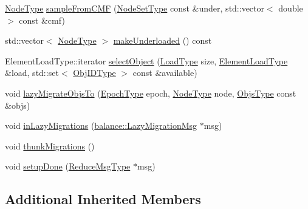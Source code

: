 \begin{DoxyCompactItemize}
\item 
\hyperlink{namespacevt_a866da9d0efc19c0a1ce79e9e492f47e2}{Node\+Type} \hyperlink{structvt_1_1vrt_1_1collection_1_1lb_1_1_gossip_l_b_a1a9e88510b1b61a181c9b4dcb3a8c153}{sample\+From\+C\+MF} (\hyperlink{structvt_1_1vrt_1_1collection_1_1lb_1_1_gossip_l_b_abb53f1d4bd3c37f3e68c3b5b0e1f1c86}{Node\+Set\+Type} const \&under, std\+::vector$<$ double $>$ const \&cmf)
\item 
std\+::vector$<$ \hyperlink{namespacevt_a866da9d0efc19c0a1ce79e9e492f47e2}{Node\+Type} $>$ \hyperlink{structvt_1_1vrt_1_1collection_1_1lb_1_1_gossip_l_b_a244326d030b7b9b82328d2ce617fef43}{make\+Underloaded} () const
\item 
Element\+Load\+Type\+::iterator \hyperlink{structvt_1_1vrt_1_1collection_1_1lb_1_1_gossip_l_b_adafa0d7c3295e095149f48c3027b3173}{select\+Object} (\hyperlink{structvt_1_1vrt_1_1collection_1_1lb_1_1_base_l_b_a215e22b9f12678303f49615ae3be05cc}{Load\+Type} size, \hyperlink{structvt_1_1vrt_1_1collection_1_1lb_1_1_base_l_b_aa286d31a0820a8fc9218ccb858368fca}{Element\+Load\+Type} \&load, std\+::set$<$ \hyperlink{structvt_1_1vrt_1_1collection_1_1lb_1_1_base_l_b_a15a2f756b59c8c2437985206b32aa403}{Obj\+I\+D\+Type} $>$ const \&available)
\item 
void \hyperlink{structvt_1_1vrt_1_1collection_1_1lb_1_1_gossip_l_b_a12cd87d3d0f4c186ffca1b554f5086dc}{lazy\+Migrate\+Objs\+To} (\hyperlink{namespacevt_a985a5adf291c34a3ca263b3378388236}{Epoch\+Type} epoch, \hyperlink{namespacevt_a866da9d0efc19c0a1ce79e9e492f47e2}{Node\+Type} node, \hyperlink{structvt_1_1vrt_1_1collection_1_1lb_1_1_gossip_l_b_ad2093cf08cc6af0f3deb4441e40c55a9}{Objs\+Type} const \&objs)
\item 
void \hyperlink{structvt_1_1vrt_1_1collection_1_1lb_1_1_gossip_l_b_a2fa63a6d2dc211423423b0d7de1d1ed6}{in\+Lazy\+Migrations} (\hyperlink{structvt_1_1vrt_1_1collection_1_1balance_1_1_lazy_migration_msg}{balance\+::\+Lazy\+Migration\+Msg} $\ast$msg)
\item 
void \hyperlink{structvt_1_1vrt_1_1collection_1_1lb_1_1_gossip_l_b_a7693c8b06ab78ef3565687621d810450}{thunk\+Migrations} ()
\item 
void \hyperlink{structvt_1_1vrt_1_1collection_1_1lb_1_1_gossip_l_b_a8ac1a82bee0f81996362076df16c2379}{setup\+Done} (\hyperlink{structvt_1_1vrt_1_1collection_1_1lb_1_1_gossip_l_b_ad251f887a319f433771b084187ef6089}{Reduce\+Msg\+Type} $\ast$msg)
\end{DoxyCompactItemize}
\subsection*{Additional Inherited Members}


